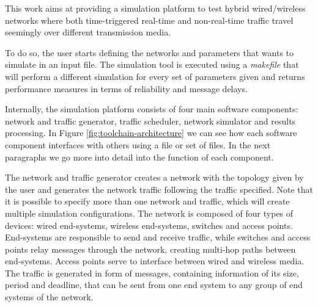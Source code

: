 \documentclass[conference]{IEEEtran}
\begin{document}
This work aims at providing a simulation platform to test hybrid wired/wireless networks where both time-triggered real-time and non-real-time traffic travel seemingly over different transmission media.


To do so, the user starts defining the networks and parameters that wants to simulate in an input file. The simulation tool is executed using a \textit{makefile} that will perform a different simulation for every set of parameters given and returns performance measures in terms of reliability and message delays.

Internally, the simulation platform consists of four main software components: network and traffic generator, traffic scheduler, network simulator and results processing. In Figure \ref{fig:toolchain-architecture} we can see how each software component interfaces with others using a file or set of files. In the next paragraphs we go more into detail into the function of each component.

The network and traffic generator creates a network with the topology given by the user and generates the network traffic following the traffic specified. Note that it is possible to specify more than one network and traffic, which will create multiple simulation configurations. The network is composed of four types of devices: wired end-systems, wireless end-systems, switches and access points. End-systems are responsible to send and receive traffic, while switches and access points relay messages through the network, creating multi-hop paths between end-systems. Access points serve to interface between wired and wireless media. The traffic is generated in form of messages, containing information of its size, period and deadline, that can be sent from one end system to any group of end systems of the network.

\end{document}
